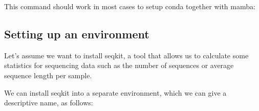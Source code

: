 \documentclass[
  letterpaper,
  DIV=11,
  numbers=noendperiod]{scrreprt}
\newenvironment{Shaded}{}{}
\newcommand{\AttributeTok}[1]{\textcolor[rgb]{0.84,0.23,0.29}{#1}}
\newcommand{\ExtensionTok}[1]{\textcolor[rgb]{0.84,0.23,0.29}{\textbf{#1}}}
\newcommand{\FunctionTok}[1]{\textcolor[rgb]{0.44,0.26,0.76}{#1}}
\newcommand{\NormalTok}[1]{\textcolor[rgb]{0.14,0.16,0.18}{#1}}
\newcommand{\StringTok}[1]{\textcolor[rgb]{0.01,0.18,0.38}{#1}}
\newcommand{\VariableTok}[1]{\textcolor[rgb]{0.89,0.38,0.04}{#1}}
\begin{document}
This command should work in most cases to setup conda together with
mamba:

\begin{Shaded}
\end{Shaded}

\subsection{Setting up an environment}\label{setting-up-an-environment}

Let's assume we want to install seqkit, a tool that allows us to
calculate some statistics for sequencing data such as the number of
sequences or average sequence length per sample.

We can install seqkit into a separate environment, which we can give a
descriptive name, as follows:
\end{document}
